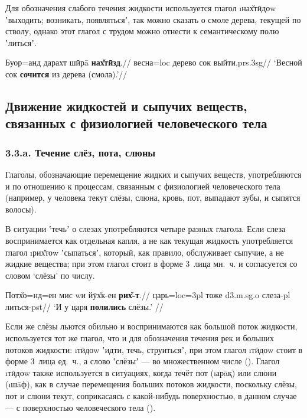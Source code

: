 Для обозначения слабого течения жидкости используется глагол \i{нах̌тӣдоw} ʽвыходить; возникать, появлятьсяʼ, так можно сказать о смоле дерева, текущей по стволу, однако этот глагол с трудом можно отнести к семантическому полю ʽлитьсяʼ.

\begingl
\gla Буор=анд дарахт шӣрā \textbf{нах̌тӣзд}.//
\glc весна={\sc loc} дерево сок выйти.{\sc prs.3sg}//
\glft ‘Весной сок \textbf{сочится} из дерева (смола).’//
\endgl \xe

\subsection{Движение жидкостей и сыпучих веществ, связанных с физиологией человеческого тела} \label{pour-33}

\subsubsection{3.3.a. Течение слёз, пота, слюны} \label{pour-33a}

Глаголы, обозначающие перемещение жидких и сыпучих веществ, употребляются и по отношению к процессам, связанным с физиологией человеческого тела (например, у человека текут слёзы, слюна, кровь, пот, выпадают зубы, и сыпятся волосы).

В ситуации ʽтечьʼ о слезах употребляются четыре разных глагола. Если слеза воспринимается как отдельная капля, а не как текущая жидкость употребляется глагол \i{рих̌тоw} ʽсыпатьсяʼ, который, как правило, обслуживает сыпучие, а не жидкие вещества; при этом глагол стоит в форме 3~лица мн.~ч. и согласуется со словом ‘слёзы’ по числу.

\begingl
\gla Потх̌о=нд=ен мис wи йӯх̌к-ен \textbf{рих̌-т}.//
\glc царь={\sc loc=3pl} тоже {\sc d3.m.sg.o} слеза-{\sc pl} литься-{\sc pst}//
\glft ‘И у царя \textbf{полились} слёзы.’ //
\endgl \xe

Если же слёзы льются обильно и воспринимаются как большой поток жидкости, используется тот же глагол, что и для обозначения течения рек и больших потоков жидкости: \i{тӣдоw} ʽидти, течь, струитьсяʼ, при этом глагол \i{тӣдоw} стоит в форме 3~лица ед.~ч., а слово ʽслёзыʼ — во множественном числе (). Глагол \i{тӣдоw} также используется в ситуациях, когда течёт пот (\i{арāқ}) или слюни (\i{шāф}), как в случае перемещения больших потоков жидкости, поскольку слёзы, пот и слюни текут, соприкасаясь с какой-нибудь поверхностью, в данном случае — с поверхностью человеческого тела ().


